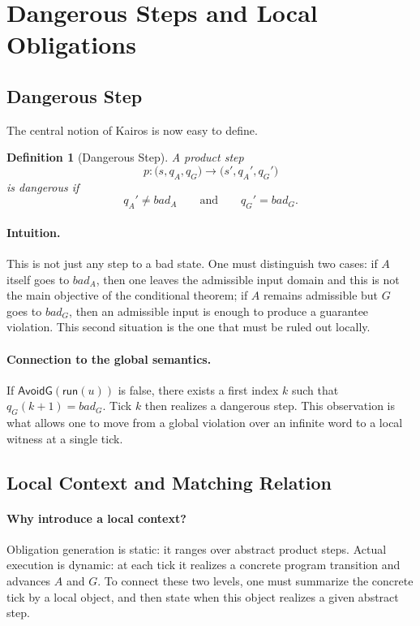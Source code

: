 \documentclass[11pt,a4paper]{article}
\newtheorem{definition}{Definition}[section]
\newcommand{\AvoidG}{\mathsf{AvoidG}}
\newcommand{\run}{\mathsf{run}}
\begin{document}
\section{Dangerous Steps and Local Obligations}

\subsection{Dangerous Step}

The central notion of Kairos is now easy to define.

\begin{definition}[Dangerous Step]
A product step
\[
p :
\bigl(s,q_A,q_G\bigr)
\longrightarrow
\bigl(s',q_A',q_G'\bigr)
\]
is \emph{dangerous} if
\[
q_A' \neq bad_A
\qquad\text{and}\qquad
q_G' = bad_G.
\]
\end{definition}

\paragraph{Intuition.}
This is not just any step to a bad state. One must distinguish two cases:
if \(A\) itself goes to \(bad_A\), then one leaves the admissible input domain
and this is not the main objective of the conditional theorem; if \(A\)
remains admissible but \(G\) goes to \(bad_G\), then an admissible input is
enough to produce a guarantee violation. This second situation is the one that
must be ruled out locally.

\paragraph{Connection to the global semantics.}
If \(\AvoidG(\run(u))\) is false, there exists a first index \(k\) such that
\(q_G(k+1)=bad_G\). Tick \(k\) then realizes a dangerous step. This observation
is what allows one to move from a global violation over an infinite word to a
local witness at a single tick.

\subsection{Local Context and Matching Relation}

\paragraph{Why introduce a local context?}
Obligation generation is static: it ranges over abstract product steps. Actual
execution is dynamic: at each tick it realizes a concrete program transition and
advances \(A\) and \(G\). To connect these two levels, one must summarize the
concrete tick by a local object, and then state when this object realizes a
given abstract step.
\end{document}

